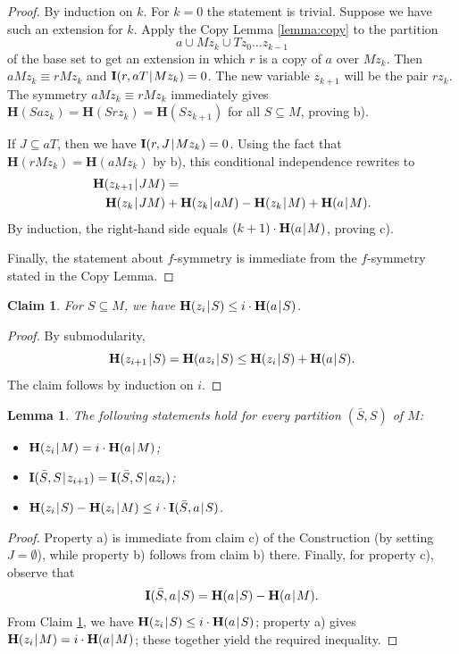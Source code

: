 \documentclass[a4paper]{IEEEtran}
\def\|{\mskip1.5mu{|}\mskip1.5mu}
\def\H{\mathbf H}
\def\I{\mathbf I}
\newtheorem{lemma}[theorem]{Lemma}
\newtheorem{claim}[theorem]{Claim}
\theoremstyle{definition}
\begin{document}
\begin{proof}
By induction on $k$. For $k=0$ the statement is trivial. Suppose we have
such an extension for $k$. Apply the Copy Lemma \ref{lemma:copy} to the
partition
$$
     a\cup Mz_k \cup Tz_0\dots z_{k-1}
$$
of the base set to get an extension in which $r$ is a copy of $a$ over
$Mz_k$. Then $aMz_k \equiv rMz_k$ and $\I(r,aT\|Mz_k)=0$. The new variable
$z_{k+1}$ will be the pair $rz_k$. The symmetry $aMz_k \equiv rMz_k$
immediately gives $\H(Saz_k)= \H(Srz_k)= \H(Sz_{k+1})$ for all $S\subseteq
M$, proving b).

If $J\subseteq aT$, then we have $\I(r,J\|Mz_k)=0$. Using the fact that $\H(rMz_k)=
\H(aMz_k)$ by b), this conditional independence rewrites to
\begin{align*}
  & \H(z_{k+1}\|JM) = {}\\
  & ~~~ \H(z_k\|JM) + \H(z_k\|aM) - \H(z_k\|M) + \H(a\|M).
\end{align*}
By induction, the right-hand side equals $(k+1)\cdot\H(a\|M)$, proving c).

Finally, the statement about $f$-symmetry is immediate from the $f$-symmetry 
stated in the Copy Lemma.
\end{proof}

\begin{claim}\label{claim:1}
For $S\subseteq M$, we have $\H(z_i\|S)\le i\cdot\H(a\|S)$.
\end{claim}
\begin{proof}
By submodularity, 
$$\H(z_{i+1}\|S)=\H(az_i\|S)\le \H(z_i\|S)+\H(a\|S).$$
The claim follows by induction on $i$.
\end{proof}

\begin{lemma}\label{lemma:D}
The following statements hold for every partition $(\bar S, S)$ of $M$:
\begin{itemize}
\item[a)] $\H(z_i\|M)=i\cdot\H(a\|M)$;
\item[b)] $\I(\bar S,S\|z_{i+1})=\I(\bar S,S\|az_i)$;
\item[c)] $\H(z_i\|S) -\H(z_i\|M) \le i\cdot\I(\bar S,a\|S)$.
\end{itemize}
\end{lemma}
\begin{proof}
Property a) is immediate from claim c) of the Construction (by setting $J=\emptyset$), while property
b) follows from claim b) there. Finally, for property c), observe that
$$
   \I(\bar S,a\|S)=\H(a\|S)-\H(a\|M).
$$
From Claim \ref{claim:1}, we have $\H(z_i\|S)\le i\cdot\H(a\|S)$;
property a) gives $\H(z_i\|M)=i\cdot\H(a\|M)$; these together yield the
required inequality.
\end{proof}
\end{document}

